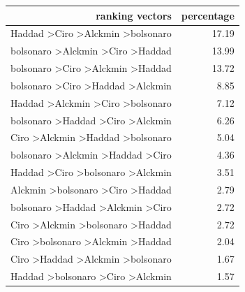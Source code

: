 \documentclass[hidelinks,11pt]{article}
\begin{document}
\begin{table}[H]
  \centering
\begin{tabular}{|r|r|}
\hline
\textbf{ranking vectors}                           & \textbf{percentage} \\ \hline
Haddad \textgreater Ciro \textgreater Alckmin \textgreater bolsonaro & 17.19                                \\ \hline
bolsonaro \textgreater Alckmin \textgreater Ciro \textgreater Haddad & 13.99                                \\ \hline
bolsonaro \textgreater Ciro \textgreater Alckmin \textgreater Haddad & 13.72                                \\ \hline
bolsonaro \textgreater Ciro \textgreater Haddad \textgreater Alckmin & 8.85                                 \\ \hline
Haddad \textgreater Alckmin \textgreater Ciro \textgreater bolsonaro & 7.12                                 \\ \hline
bolsonaro \textgreater Haddad \textgreater Ciro \textgreater Alckmin & 6.26                                 \\ \hline
Ciro \textgreater Alckmin \textgreater Haddad \textgreater bolsonaro & 5.04                                 \\ \hline
bolsonaro \textgreater Alckmin \textgreater Haddad \textgreater Ciro & 4.36                                 \\ \hline
Haddad \textgreater Ciro \textgreater bolsonaro \textgreater Alckmin & 3.51                                 \\ \hline
Alckmin \textgreater bolsonaro \textgreater Ciro \textgreater Haddad & 2.79                                 \\ \hline
bolsonaro \textgreater Haddad \textgreater Alckmin \textgreater Ciro & 2.72                                 \\ \hline
Ciro \textgreater Alckmin \textgreater bolsonaro \textgreater Haddad & 2.72                                 \\ \hline
Ciro \textgreater bolsonaro \textgreater Alckmin \textgreater Haddad & 2.04                                 \\ \hline
Ciro \textgreater Haddad \textgreater Alckmin \textgreater bolsonaro & 1.67                                 \\ \hline
Haddad \textgreater bolsonaro \textgreater Ciro \textgreater Alckmin & 1.57                                 \\ \hline

\end{tabular}
\end{table}
\end{document}
